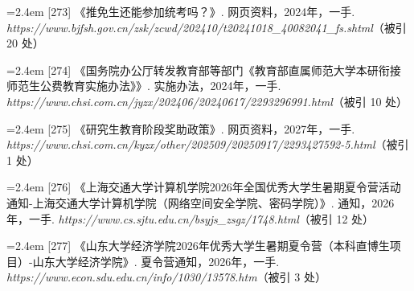 {\vspace{0.6pt}
\vspace{3.5pt}\par
\nopagebreak\vspace{1pt}
\noindent\hangindent=2.4em \label{src:S0352}{\color{cAccent}[273]} 《推免生还能参加统考吗？》. 网页资料，2024年，一手. \textit{https://www.bjfsh.gov.cn/zsk/zcwd/202410/t20241018\_40082041\_fs.shtml}（被引 20 处）\par
\vspace{0.6pt}
\vspace{3.5pt}\par
\nopagebreak\vspace{1pt}
\noindent\hangindent=2.4em \label{src:S0355}{\color{cAccent}[274]} 《国务院办公厅转发教育部等部门《教育部直属师范大学本研衔接师范生公费教育实施办法》》. 实施办法，2024年，一手. \textit{https://www.chsi.com.cn/jyzx/202406/20240617/2293296991.html}（被引 10 处）\par
\vspace{0.6pt}
\noindent\hangindent=2.4em \label{src:S0356}{\color{cAccent}[275]} 《研究生教育阶段奖助政策》. 网页资料，2027年，一手. \textit{https://www.chsi.com.cn/kyzx/other/202509/20250917/2293427592-5.html}（被引 1 处）\par
\vspace{0.6pt}
\vspace{3.5pt}\par
\nopagebreak\vspace{1pt}
\noindent\hangindent=2.4em \label{src:S0358}{\color{cAccent}[276]} 《上海交通大学计算机学院2026年全国优秀大学生暑期夏令营活动通知-上海交通大学计算机学院（网络空间安全学院、密码学院）》. 通知，2026年，一手. \textit{https://www.cs.sjtu.edu.cn/bsyjs\_zsgz/1748.html}（被引 12 处）\par
\vspace{0.6pt}
\vspace{3.5pt}\par
\nopagebreak\vspace{1pt}
\noindent\hangindent=2.4em \label{src:S0360}{\color{cAccent}[277]} 《山东大学经济学院2026年优秀大学生暑期夏令营（本科直博生项目）-山东大学经济学院》. 夏令营通知，2026年，一手. \textit{https://www.econ.sdu.edu.cn/info/1030/13578.htm}（被引 3 处）\par
}
